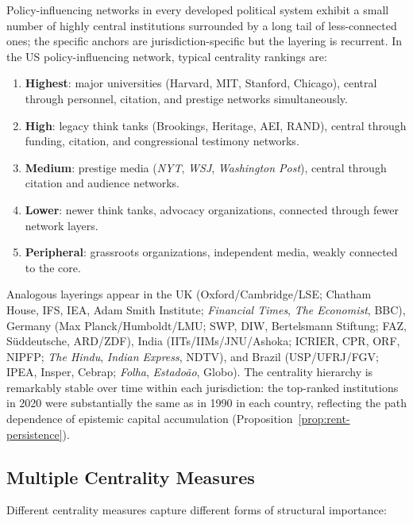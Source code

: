 \begin{example}
\label{ex:centrality-hierarchy}
Policy-influencing networks in every developed political system exhibit a small number of highly central institutions surrounded by a long tail of less-connected ones; the specific anchors are jurisdiction-specific but the layering is recurrent.
In the US policy-influencing network, typical centrality rankings are:
\begin{enumerate}[nosep]
  \item \textbf{Highest}: major universities (Harvard, MIT, Stanford, Chicago), central through personnel, citation, and prestige networks simultaneously.
  \item \textbf{High}: legacy think tanks (Brookings, Heritage, AEI, RAND), central through funding, citation, and congressional testimony networks.
  \item \textbf{Medium}: prestige media (\textit{NYT}, \textit{WSJ}, \textit{Washington Post}), central through citation and audience networks.
  \item \textbf{Lower}: newer think tanks, advocacy organizations, connected through fewer network layers.
  \item \textbf{Peripheral}: grassroots organizations, independent media, weakly connected to the core.
\end{enumerate}
Analogous layerings appear in the UK (Oxford/Cambridge/LSE; Chatham House, IFS, IEA, Adam Smith Institute; \textit{Financial Times}, \textit{The Economist}, BBC), Germany (Max Planck/Humboldt/LMU; SWP, DIW, Bertelsmann Stiftung; FAZ, S{\"u}ddeutsche, ARD/ZDF), India (IITs/IIMs/JNU/Ashoka; ICRIER, CPR, ORF, NIPFP; \textit{The Hindu}, \textit{Indian Express}, NDTV), and Brazil (USP/UFRJ/FGV; IPEA, Insper, Cebrap; \textit{Folha}, \textit{Estado{\~a}o}, Globo).
The centrality hierarchy is remarkably stable over time within each jurisdiction: the top-ranked institutions in 2020 were substantially the same as in 1990 in each country, reflecting the path dependence of epistemic capital accumulation (Proposition~\ref{prop:rent-persistence}).
\end{example}

\subsection{Multiple Centrality Measures}

Different centrality measures capture different forms of structural importance:

